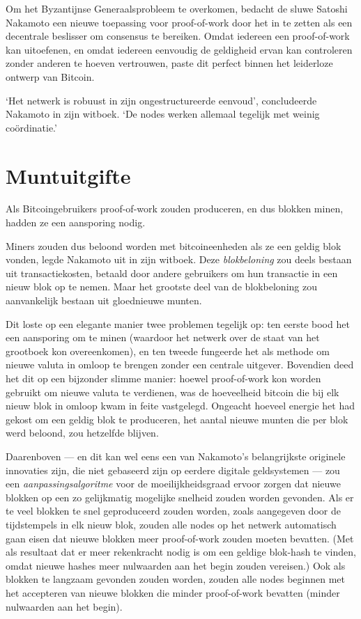 \documentclass[smalldemyvopaper,11pt,twoside,onecolumn,openright,extrafontsizes,hidelinks]{memoir}
\begin{document}
Om het Byzantijnse Generaalsprobleem te overkomen, bedacht de sluwe
Satoshi Nakamoto een nieuwe toepassing voor proof-of-work door het in te
zetten als een decentrale beslisser om consensus te bereiken. Omdat
iedereen een proof-of-work kan uitoefenen, en omdat iedereen eenvoudig
de geldigheid ervan kan controleren zonder anderen te hoeven vertrouwen,
paste dit perfect binnen het leiderloze ontwerp van Bitcoin.

`Het netwerk is robuust in zijn ongestructureerde eenvoud', concludeerde
Nakamoto in zijn witboek. `De nodes werken allemaal tegelijk met weinig
coördinatie.'

\section{Muntuitgifte}\label{muntuitgifte}

Als Bitcoingebruikers proof-of-work zouden produceren, en dus blokken
minen, hadden ze een aansporing nodig.

Miners zouden dus beloond worden met bitcoineenheden als ze een geldig
blok vonden, legde Nakamoto uit in zijn witboek. Deze
\emph{blokbeloning} zou deels bestaan uit transactiekosten, betaald door
andere gebruikers om hun transactie in een nieuw blok op te nemen. Maar
het grootste deel van de blokbeloning zou aanvankelijk bestaan uit
gloednieuwe munten.

Dit loste op een elegante manier twee problemen tegelijk op: ten eerste
bood het een aansporing om te minen (waardoor het netwerk over de staat
van het grootboek kon overeenkomen), en ten tweede fungeerde het als
methode om nieuwe valuta in omloop te brengen zonder een centrale
uitgever. Bovendien deed het dit op een bijzonder slimme manier: hoewel
proof-of-work kon worden gebruikt om nieuwe valuta te verdienen, was de
hoeveelheid bitcoin die bij elk nieuw blok in omloop kwam in feite
vastgelegd. Ongeacht hoeveel energie het had gekost om een geldig blok
te produceren, het aantal nieuwe munten die per blok werd beloond, zou
hetzelfde blijven.

Daarenboven --- en dit kan wel eens een van Nakamoto's belangrijkste
originele innovaties zijn, die niet gebaseerd zijn op eerdere digitale
geldsystemen --- zou een \emph{aanpassingsalgoritme} voor de
moeilijkheidsgraad ervoor zorgen dat nieuwe blokken op een zo
gelijkmatig mogelijke snelheid zouden worden gevonden. Als er te veel
blokken te snel geproduceerd zouden worden, zoals aangegeven door de
tijdstempels in elk nieuw blok, zouden alle nodes op het netwerk
automatisch gaan eisen dat nieuwe blokken meer proof-of-work zouden
moeten bevatten. (Met als resultaat dat er meer rekenkracht nodig is om
een geldige blok-hash te vinden, omdat nieuwe hashes meer nulwaarden aan
het begin zouden vereisen.) Ook als blokken te langzaam gevonden zouden
worden, zouden alle nodes beginnen met het accepteren van nieuwe blokken
die minder proof-of-work bevatten (minder nulwaarden aan het begin).
\end{document}
